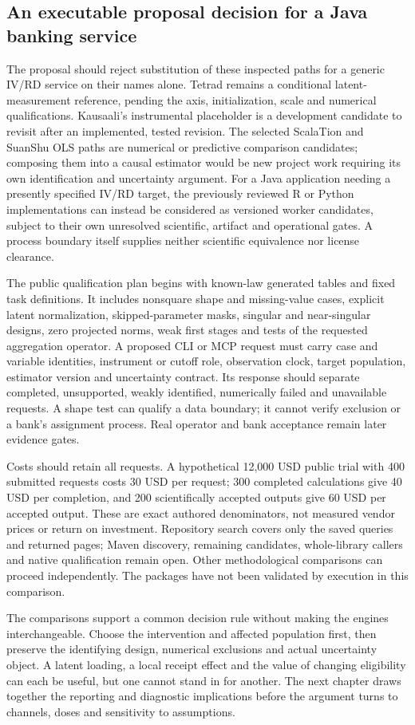 \subsection{An executable proposal decision for a Java banking service}

The proposal should reject substitution of these inspected paths for a generic IV/RD service on their names alone. Tetrad remains a conditional latent-measurement reference, pending the axis, initialization, scale and numerical qualifications. Kausaali's instrumental placeholder is a development candidate to revisit after an implemented, tested revision. The selected ScalaTion and SuanShu OLS paths are numerical or predictive comparison candidates; composing them into a causal estimator would be new project work requiring its own identification and uncertainty argument. For a Java application needing a presently specified IV/RD target, the previously reviewed R or Python implementations can instead be considered as versioned worker candidates, subject to their own unresolved scientific, artifact and operational gates. A process boundary itself supplies neither scientific equivalence nor license clearance.~\citep{exec25_javaiv_choice,exec25_pyrdiv_choice}

The public qualification plan begins with known-law generated tables and fixed task definitions. It includes nonsquare shape and missing-value cases, explicit latent normalization, skipped-parameter masks, singular and near-singular designs, zero projected norms, weak first stages and tests of the requested aggregation operator. A proposed CLI or MCP request must carry case and variable identities, instrument or cutoff role, observation clock, target population, estimator version and uncertainty contract. Its response should separate completed, unsupported, weakly identified, numerically failed and unavailable requests. A shape test can qualify a data boundary; it cannot verify exclusion or a bank's assignment process. Real operator and bank acceptance remain later evidence gates.

Costs should retain all requests. A hypothetical 12,000 USD public trial with 400 submitted requests costs 30 USD per request; 300 completed calculations give 40 USD per completion, and 200 scientifically accepted outputs give 60 USD per accepted output. These are exact authored denominators, not measured vendor prices or return on investment. Repository search covers only the saved queries and returned pages; Maven discovery, remaining candidates, whole-library callers and native qualification remain open. Other methodological comparisons can proceed independently. The packages have not been validated by execution in this comparison.~\citep{exec25_javaiv_choice}


The comparisons support a common decision rule without making the engines
interchangeable. Choose the intervention and affected population first, then
preserve the identifying design, numerical exclusions and actual uncertainty
object. A latent loading, a local receipt effect and the value of changing
eligibility can each be useful, but one cannot stand in for another. The next
chapter draws together the reporting and diagnostic implications before the
argument turns to channels, doses and sensitivity to assumptions.
